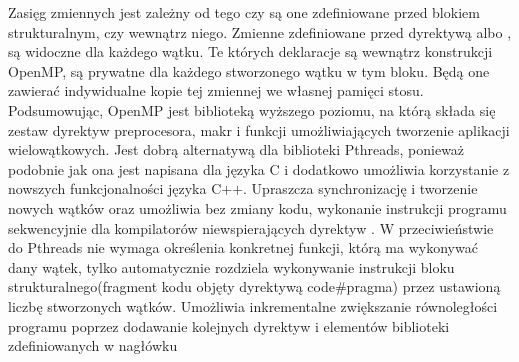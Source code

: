 \documentclass[document.tex]{subfiles}
\begin{document}
\indent Zasięg zmiennych jest zależny od tego czy są one zdefiniowane przed blokiem strukturalnym, czy wewnątrz niego. Zmienne zdefiniowane przed dyrektywą 
albo , są widoczne dla każdego wątku. Te których deklaracje są wewnątrz
konstrukcji OpenMP, są prywatne dla każdego stworzonego wątku w tym bloku.
Będą one zawierać indywidualne kopie tej zmiennej we własnej pamięci stosu.
\cite{openmp_pacheco}\cite{openmp_spec}
\\
\indent Podsumowując, OpenMP jest biblioteką wyższego poziomu, na którą składa się
zestaw dyrektyw preprocesora, makr i funkcji umożliwiających tworzenie aplikacji
wielowątkowych. Jest dobrą alternatywą dla biblioteki Pthreads, ponieważ podobnie jak
ona jest napisana dla języka C i dodatkowo umożliwia korzystanie z nowszych funkcjonalności
języka C++. Upraszcza synchronizację i tworzenie nowych wątków oraz umożliwia bez zmiany
kodu, wykonanie instrukcji programu sekwencyjnie dla kompilatorów niewspierających dyrektyw . W przeciwieństwie do Pthreads nie wymaga określenia konkretnej funkcji,
którą ma wykonywać dany wątek, tylko automatycznie rozdziela wykonywanie instrukcji bloku
strukturalnego(fragment kodu objęty dyrektywą code{\#pragma}) przez ustawioną liczbę stworzonych wątków. Umożliwia inkrementalne zwiększanie
równoległości programu poprzez dodawanie kolejnych dyrektyw i elementów biblioteki zdefiniowanych w nagłówku 
\end{document}
